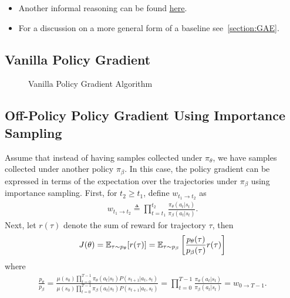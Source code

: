 \documentclass{article}
\begin{document}
\begin{itemize}
    \item Another informal reasoning can be found 
\href{https://danieltakeshi.github.io/2017/03/28/going-deeper-into-reinforcement-learning-fundamentals-of-policy-gradients/#:~:text=The%
}{\underline{here}}.
    \item For a discussion on a more general form of a baseline see~\cref{section:GAE}.
\end{itemize}


\subsection{Vanilla Policy Gradient}

\begin{figure}[ht]
\caption{Vanilla Policy Gradient Algorithm}\label{fig:vanilla}
\end{figure} 

\subsection{Off-Policy Policy Gradient Using Importance Sampling}\label{section:pg_off_policy}
Assume that instead of having samples collected under $\pi_\theta$, we have samples collected under another policy $\pi_\beta$. In this case, the policy gradient can be expressed in terms of the expectation over the trajectories under $\pi_\beta$ using importance sampling. First, for $t_2 \ge t_1$, define $w_{t_1 \to t_2}$ as
\begin{align}
w_{t_1 \to t_2} \triangleq \prod_{t= t_1}^{t_2}
    \frac{\pi_\theta(a_t \vert s_t)}{\pi_\beta(a_t \vert s_t)}.
\end{align}
Next, let $r(\tau)$ denote the sum of reward for trajectory $\tau$, then
\begin{align*}
    J(\theta) = {\mathbb E}_{\tau \sim p_\theta} [r(\tau)] = {\mathbb E}_{\tau \sim p_\beta} \left[\frac{p_\theta(\tau)}{p_\beta(\tau)} r(\tau) \right]
\end{align*}
where 
\begin{align*}
    \frac{p_\theta}{p_\beta} = \frac{\mu(s_0) \prod_{t=0}^{T-1}\pi_\theta(a_t \vert s_t) P(s_{t+1}\vert a_t, s_t)}{\mu(s_0) \prod_{t=0}^{T-1}\pi_\beta(a_t \vert s_t) P(s_{t+1}\vert a_t, s_t)} =
    \prod_{t=0}^{T-1}
    \frac{\pi_\theta(a_t \vert s_t)}{\pi_\beta(a_t \vert s_t)} = w_{0\to{T-1}}.
\end{align*}
\end{document}
